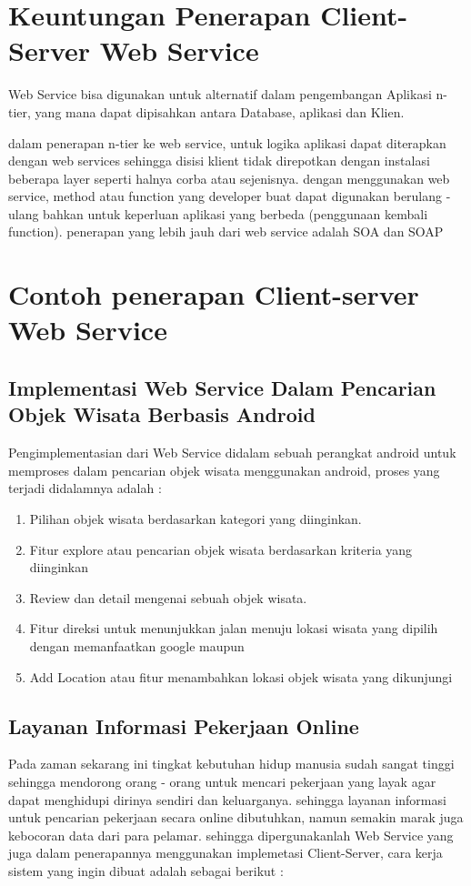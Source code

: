 {\section{Keuntungan Penerapan Client-Server Web Service}
Web Service bisa digunakan untuk alternatif dalam pengembangan Aplikasi n-tier, yang mana dapat dipisahkan
antara Database, aplikasi dan Klien. 

dalam penerapan n-tier ke web service, untuk logika aplikasi dapat diterapkan dengan web services
sehingga disisi klient tidak direpotkan dengan instalasi beberapa layer seperti halnya corba atau sejenisnya.
dengan menggunakan web service, method atau function yang developer buat dapat digunakan berulang - ulang bahkan
untuk keperluan aplikasi yang berbeda (penggunaan kembali function). penerapan yang lebih jauh dari web service adalah SOA dan SOAP

\section{Contoh penerapan Client-server Web Service}
\subsection{Implementasi Web Service Dalam Pencarian Objek Wisata Berbasis Android}
Pengimplementasian dari Web Service didalam sebuah perangkat android untuk memproses
dalam pencarian objek wisata menggunakan android, proses yang terjadi didalamnya adalah :

\begin{enumerate}
    \item Pilihan objek wisata berdasarkan kategori yang diinginkan.
    \item Fitur explore atau pencarian objek wisata berdasarkan kriteria yang diinginkan
    \item Review dan detail mengenai sebuah objek wisata.
    \item Fitur direksi untuk menunjukkan jalan menuju lokasi wisata yang dipilih dengan memanfaatkan google maupun
    \item Add Location atau fitur menambahkan lokasi objek wisata yang dikunjungi
\end{enumerate}

\subsection{Layanan Informasi Pekerjaan Online}
Pada zaman sekarang ini tingkat kebutuhan hidup manusia sudah sangat tinggi sehingga mendorong orang - orang
untuk mencari pekerjaan yang layak agar dapat menghidupi dirinya sendiri dan keluarganya. sehingga 
layanan informasi untuk pencarian pekerjaan secara online dibutuhkan, namun semakin marak juga kebocoran
data dari para pelamar. sehingga dipergunakanlah Web Service yang juga dalam penerapannya menggunakan
implemetasi Client-Server, cara kerja sistem yang ingin dibuat adalah sebagai berikut :

}
